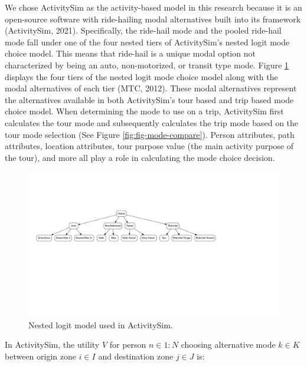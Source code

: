 \documentclass[fancy, masters]{byuthesis}
\begin{document}
We chose ActivitySim as the activity-based model in this research because it is an open-source software with ride-hailing modal alternatives built into its framework (ActivitySim, 2021). Specifically, the ride-hail mode and the pooled ride-hail mode fall under one of the four nested tiers of ActivitySim's nested logit mode choice model. This means that ride-hail is a unique modal option not characterized by being an auto, non-motorized, or transit type mode. Figure \ref{fig:fig-asim-nest} displays the four tiers of the nested logit mode choice model along with the modal alternatives of each tier (MTC, 2012). These modal alternatives represent the alternatives available in both ActivitySim's tour based and trip based mode choice model. When determining the mode to use on a trip, ActivitySim first calculates the tour mode and subsequently calculates the trip mode based on the tour mode selection (See Figure \ref{fig:fig-mode-compare}). Person attributes, path attributes, location attributes, tour purpose value (the main activity purpose of the tour), and more all play a role in calculating the mode choice decision.

\begin{figure}

{\centering \includegraphics[width=1.8\linewidth,trim = {3cm 9.5cm 4.5cm 6cm}]{thesis_files/figure-latex/fig-asim-nest-1} 

}

\caption{Nested logit model used in ActivitySim.}\label{fig:fig-asim-nest}
\end{figure}

In ActivitySim, the utility \(V\) for person \(n \in {1:N}\) choosing alternative mode \(k \in K\) between origin zone \(i \in I\) and destination zone \(j \in J\) is:
\end{document}
